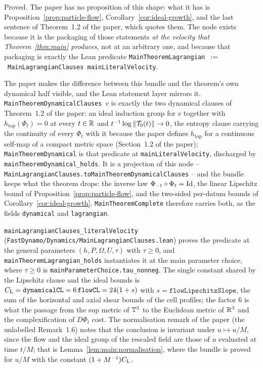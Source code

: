 Proved.  The paper has no proposition of this shape: what it has is
Proposition~\ref{prop:particle-flow}, Corollary~\ref{cor:ideal-growth}, and the last
sentence of Theorem~1.2 of the paper, which quotes them.  The node exists because it is the
packaging of those statements \emph{at the velocity that
Theorem~\ref{thm:main} produces}, not at an arbitrary one, and because that packaging is
exactly the Lean predicate
\texttt{MainTheoremLagrangian}~$:=$~\texttt{MainLagrangianClauses mainLiteralVelocity}.

The paper makes the difference between this bundle and the theorem's own dynamical half
visible, and the Lean statement layer mirrors it.
\texttt{MainTheoremDynamicalClauses}~$v$ is exactly the two dynamical clauses of
Theorem~1.2 of the paper: an
ideal induction group for $v$ together with $h_{\mathrm{top}}(\Phi_t)=0$ at every $t\in\mathbb{R}$
and $t^{-1}\log\left\|\mathcal T_0(t)\right\|\to0$, the entropy clause carrying the continuity of
every $\Phi_t$ with it because the paper defines $h_{\mathrm{top}}$ for a continuous self-map
of a compact metric space (Section~1.2 of the paper); \texttt{MainTheoremDynamical} is that
predicate
at \texttt{mainLiteralVelocity}, discharged by
\texttt{mainTheoremDynamical\_holds}.  It is a projection of this node --
\texttt{MainLagrangianClauses.toMainTheoremDynamicalClauses} -- and the bundle keeps what
the theorem drops: the inverse law $\Phi_{-t}\circ\Phi_t=\mathrm{Id}$, the linear Lipschitz
bound of Proposition~\ref{prop:particle-flow}, and the two-sided per-datum bounds of
Corollary~\ref{cor:ideal-growth}.  \texttt{MainTheoremComplete} therefore carries both, as
the fields \texttt{dynamical} and \texttt{lagrangian}.

\texttt{mainLagrangianClauses\_literalVelocity}
(\texttt{FastDynamo/Dynamics/MainLagrangianClauses.lean}) proves the predicate at the general
parameters $(h,P,\Omega,U,\tau)$ with $\tau\geq0$, and \texttt{mainTheoremLagrangian\_holds}
instantiates it at the main parameter choice, where $\tau\geq0$ is
\texttt{mainParameterChoice.tau\_nonneg}.  The single constant shared by the Lipschitz
clause and the ideal bounds is
$C_{\rm L}=\texttt{dynamicalCL}=6\,\texttt{flowCL}=24(1+s)$ with
$s=\texttt{flowLipschitzSlope}$, the sum of the horizontal and axial shear bounds of the cell
profiles; the factor $6$ is what the passage from the sup metric of $\mathbb{T}^3$ to the Euclidean
metric of $\mathbb{R}^3$ and the complexification of $D\Phi_t$ cost.  The normalisation remark of the
paper (the unlabelled Remark~1.6) notes that the conclusion is invariant under $u\mapsto u/M $,
since the flow and the ideal group of the rescaled field are those of $u $ evaluated at time
$t/M $; that is Lemma~\ref{lem:main:normalisation}, where the bundle is proved for $u/M$ with
the constant $(1+M^{-1})C_{\rm L}$.


